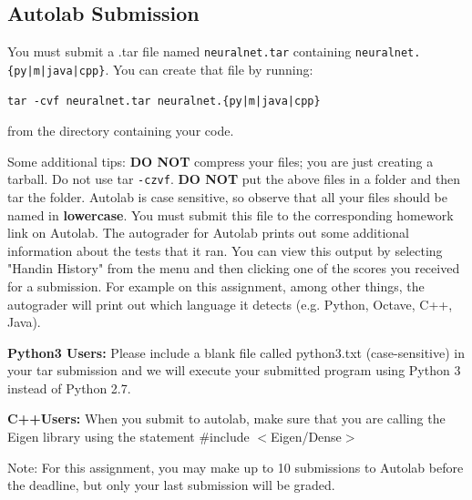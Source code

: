 \documentclass[11pt]{article}
\numberwithin{equation}{section} %
\numberwithin{figure}{section} %
\numberwithin{table}{section} %
\begin{document}
\subsection{Autolab Submission}

You must submit a .tar file named {\tt neuralnet.tar} containing \texttt{neuralnet.\{py|m|java|cpp\}}.
You can create that file by running:
\begin{lstlisting}
tar -cvf neuralnet.tar neuralnet.{py|m|java|cpp}
\end{lstlisting}
from the directory containing your code.

Some additional tips: {\bf DO NOT} compress your files; you are just
creating a tarball. Do not use tar \texttt{-czvf}.  {\bf DO NOT} put
the above files in a folder and then tar the folder.  Autolab is case
sensitive, so observe that all your files should be named in {\bf
  lowercase}. You must submit this file to the corresponding homework
link on Autolab. The autograder for Autolab prints out some additional 
information about the tests that it ran. You can view this output by selecting 
 "Handin History" from the menu and then clicking one of the scores you 
 received for a submission. For example on this assignment, among other things, 
 the autograder will print out which language it detects (e.g. Python, Octave, C++, Java). 
 
 \begin{notebox}
  {\bf Python3 Users:} Please include a blank file called python3.txt (case-sensitive) in your tar submission and we will execute your submitted program using Python 3 instead of Python 2.7.
 \end{notebox}
 
  \begin{notebox}
  {\bf C++Users:} When you submit to autolab, make sure that you are calling the Eigen library using the statement \#include $<$Eigen/Dense$>$
 \end{notebox}

Note: For this assignment, you may make up to 10 submissions to Autolab before the deadline, but only your last submission will be graded.

\end{document}
